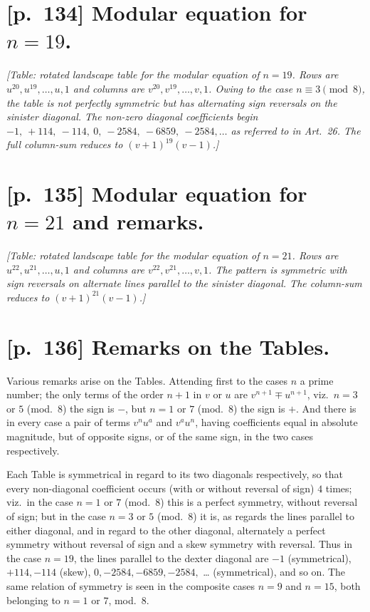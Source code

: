 \documentclass[11pt]{article}
\begin{document}
\clearpage
\section*{[p.~134] Modular equation for $n=19$.}

\textit{[Table: rotated landscape table for the modular equation of
$n=19$. Rows are $u^{20}, u^{19}, \ldots, u, 1$ and columns are
$v^{20}, v^{19}, \ldots, v, 1$. Owing to the case $n \equiv 3 \pmod{8}$, the
table is not perfectly symmetric but has alternating sign reversals on the
sinister diagonal. The non-zero diagonal coefficients begin
$-1,\ +114,\ -114,\ 0,\ -2584,\ -6859,\ -2584,\ldots$ as referred to in
Art.\ 26. The full column-sum reduces to $(v + 1)^{19}(v - 1)$.]}

\clearpage
\section*{[p.~135] Modular equation for $n=21$ and remarks.}

\textit{[Table: rotated landscape table for the modular equation of
$n=21$. Rows are $u^{22}, u^{21}, \ldots, u, 1$ and columns are
$v^{22}, v^{21}, \ldots, v, 1$. The pattern is symmetric with sign
reversals on alternate lines parallel to the sinister diagonal. The
column-sum reduces to $(v + 1)^{21}(v - 1)$.]}

\section*{[p.~136] Remarks on the Tables.}

Various remarks arise on the Tables. Attending first to the cases $n$ a
prime number; the only terms of the order $n+1$ in $v$ or $u$ are
$v^{n+1} \mp u^{n+1}$, viz.\ $n = 3$ or $5$ (mod.\ 8) the sign is $-$, but
$n = 1$ or $7$ (mod.\ 8) the sign is $+$. And there is in every case a
pair of terms $v^n u^a$ and $v^a u^n$, having coefficients equal in absolute
magnitude, but of opposite signs, or of the same sign, in the two cases
respectively.

Each Table is symmetrical in regard to its two diagonals respectively, so
that every non-diagonal coefficient occurs (with or without reversal of
sign) $4$ times; viz.\ in the case $n=1$ or $7$ (mod.\ 8) this is a
perfect symmetry, without reversal of sign; but in the case $n=3$ or $5$
(mod.\ 8) it is, as regards the lines parallel to either diagonal, and in
regard to the other diagonal, alternately a perfect symmetry without
reversal of sign and a skew symmetry with reversal. Thus in the case
$n = 19$, the lines parallel to the dexter diagonal are
$-1$ (symmetrical), $+114, -114$ (skew), $0, -2584, -6859, -2584,$ \ldots
(symmetrical), and so on. The same relation of symmetry is seen in the
composite cases $n=9$ and $n=15$, both belonging to $n=1$ or $7$, mod.\ 8.
\end{document}
